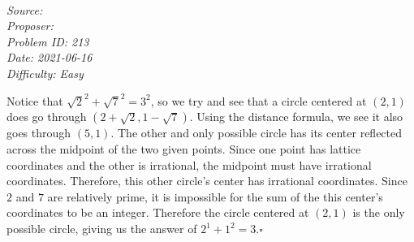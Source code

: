 \SSbreak\\
\emph{Source: \Cop}\\
\emph{Proposer: \Plot}\\ %
\emph{Problem ID: 213}\\
\emph{Date: 2021-06-16}\\
\emph{Difficulty: Easy}\\
\SSbreak

\bigskip

\begin{solution}\hfil\medskip
  
    Notice that $\sqrt{2}^2+\sqrt{7}^2=3^2$, so we try and see that a circle centered at $(2,1)$ does go through $(2+\sqrt{2}, 1-\sqrt{7})$. Using the distance formula, we see it also goes through $(5,1)$. The other and only possible circle has its center reflected across the midpoint of the two given points. Since one point has lattice coordinates and the other is irrational, the midpoint must have irrational coordinates. Therefore, this other circle's center has irrational coordinates. Since $2$ and $7$ are relatively prime, it is impossible for the sum of the this center's coordinates to be an integer. Therefore the circle centered at $(2,1)$ is the only possible circle, giving us the answer of $2^1+1^2=\boxed{3}.\square$
\end{solution}\bigskip